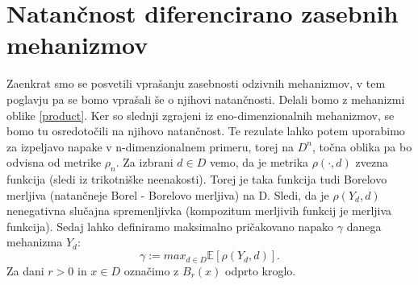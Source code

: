 \documentclass[12pt,a4paper]{amsart}
\theoremstyle{definition} %
\theoremstyle{plain} %
\begin{document}
\section{Natančnost diferencirano zasebnih mehanizmov}
Zaenkrat smo se posvetili vprašanju zasebnosti odzivnih mehanizmov, v tem poglavju pa se bomo vprašali še o njihovi natančnosti. Delali bomo z mehanizmi oblike \eqref{product}. Ker so slednji zgrajeni iz eno-dimenzionalnih mehanizmov, se bomo tu osredotočili na njihovo natančnost. Te rezulate lahko potem uporabimo za izpeljavo napake v n-dimenzionalnem primeru, torej na $D^n$, točna oblika pa bo odvisna od metrike $\rho_n$.
\newline
\newline
Za izbrani $d \in D$ vemo, da je metrika $\rho( \cdot , d)$ zvezna funkcija (sledi iz trikotniške neenakosti). Torej je taka funkcija tudi Borelovo merljiva (natančneje Borel - Borelovo merljiva) na D.  Sledi, da je $\rho(Y_d,d)$ nenegativna slučajna spremenljivka (kompozitum merljivih funkcij je merljiva funkcija). Sedaj lahko definiramo maksimalno pričakovano napako $\gamma$ danega mehanizma $Y_d$: $$\gamma := max_{d\in D}\mathbb{E}[\rho(Y_d,d)].$$ Za dani $r > 0$ in $x \in D$ označimo z $B_r(x)$ odprto kroglo. 
\end{document}
